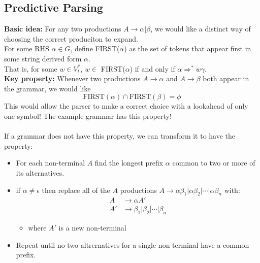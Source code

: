 \documentclass[10pt]{article}
\begin{document}
\subsection*{Predictive Parsing}
\textbf{Basic idea:} For any two productions $A \rightarrow \alpha \vert \beta$, we would like a distinct way of choosing the correct produciton to expand.\\
For some RHS $\alpha \in G$, define FIRST($\alpha$) as the set of tokens that appear first in some string derived form $\alpha$.\\
That is, for some $w \in V_t^*$, $w \in$ FIRST($\alpha$) if and only if $\alpha \Rightarrow^* w\gamma$.\\
\textbf{Key property:} Whenever two productions $A \rightarrow \alpha$ and $A \rightarrow \beta$ both appear in the grammar, we would like
\[\text{FIRST}(\alpha)\cap\text{FIRST}(\beta) = \phi\]
This would allow the parser to make a correct choice with a lookahead of only one symbol!  The example grammar has this property!\\\\
If a grammar does not have this property, we can transform it to have the property:
\begin{itemize}
    \item For each non-terminal $A$ find the longest prefix $\alpha$ common to two or more of its alternatives.
    \item if $\alpha \neq \epsilon$ then replace all of the $A$ productions $A \rightarrow \alpha \beta_1 \vert \alpha \beta_2 \vert \cdots \vert \alpha\beta_n$ with:
    \begin{align*}
        A &\rightarrow \alpha A'\\
        A' &\rightarrow \beta_1 \vert \beta_2 \vert \cdots \vert \beta_n
    \end{align*}
    \begin{itemize}
        \item where $A'$ is a new non-terminal
    \end{itemize}   
    \item Repeat until no two altrernatives for a single non-terminal have a common prefix.
    
\end{itemize}
\end{document}
